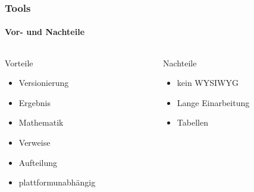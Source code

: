 \begin{frame}
    \frametitle{Tools}
    \framesubtitle{Vor- und Nachteile}
    \begin{columns}
        \begin{column}{0.50\textwidth}
            \begin{block}{Vorteile}
                \begin{itemize}
                    \item Versionierung
                    \item Ergebnis
                    \item Mathematik
                    \item Verweise
                    \item Aufteilung
                    \item plattformunabhängig
                \end{itemize}
            \end{block}
        \end{column}
        \pause
        \begin{column}{0.50\textwidth}
            \begin{block}{Nachteile}
                \begin{itemize}
                    \item kein WYSIWYG
                    \item Lange Einarbeitung
                    \item Tabellen
                \end{itemize}
            \end{block}
        \end{column}
    \end{columns}
\end{frame}
